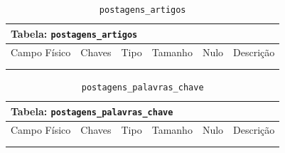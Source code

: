 \documentclass[12pt,a4paper]{article}
\begin{document}
\begin{center}
\begin{table}[h!]
	\caption{\texttt{postagens\_artigos}}
	\label{tabela:postagensArtigos}
	\begin{tabular}{|p{2.5cm}|p{1cm}|p{1.25cm}|p{1.75cm}|p{1.25cm}|p{5cm}|}\hline	
		\multicolumn{6}{|p{16cm}|}{\cellcolor{cinzaClaro}  \centering Tabela: \texttt{postagens\_artigos}} \\ \hline %
		{\small Campo Físico}   & {\small Chaves} & {\small Tipo} & {\small Tamanho} & {\small Nulo} & {\small Descrição}\\\hline %
		
		{\tiny } & {\tiny } & {\tiny } & {\tiny } & {\tiny } &{\tiny }\\\hline
		{\tiny } & {\tiny } & {\tiny } & {\tiny } & {\tiny } &{\tiny }\\\hline
		
			
	\end{tabular}
\end{table}	
\end{center}


\begin{center}
\begin{table}[h!]
	\caption{\texttt{postagens\_palavras\_chave}}
	\label{tabela:postagensPalavrasChave}
	\begin{tabular}{|p{2.5cm}|p{1cm}|p{1.25cm}|p{1.75cm}|p{1.25cm}|p{5cm}|}\hline	
		\multicolumn{6}{|p{16cm}|}{\cellcolor{cinzaClaro}  \centering Tabela: \texttt{postagens\_palavras\_chave}} \\ \hline %
		{\small Campo Físico}   & {\small Chaves} & {\small Tipo} & {\small Tamanho} & {\small Nulo} & {\small Descrição}\\\hline %
		
		{\tiny } & {\tiny } & {\tiny } & {\tiny } & {\tiny } &{\tiny }\\\hline
		{\tiny } & {\tiny } & {\tiny } & {\tiny } & {\tiny } &{\tiny }\\\hline
			
	\end{tabular}
\end{table}	
\end{center}
\end{document}
